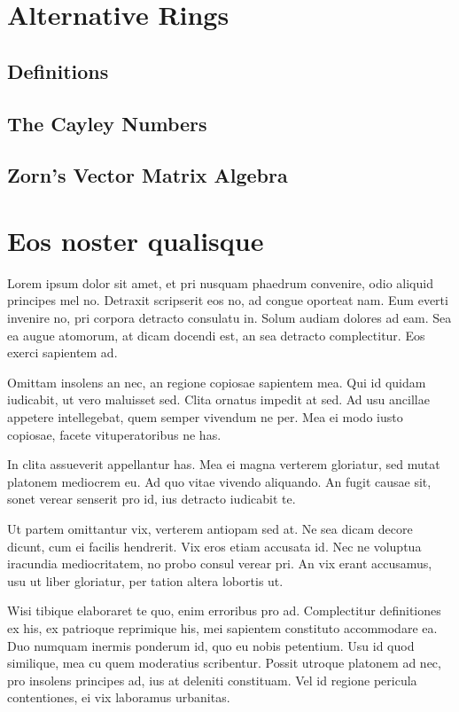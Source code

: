 \chapter{Alternative Rings} 
\label{altrings} %
\section{Definitions} 
\label{defs} 
 
\section{The Cayley Numbers} 
\label{cayley} 
 
\section{Zorn's Vector Matrix Algebra} 
\label{zorn} 

\chapter{Eos noster qualisque}
Lorem ipsum dolor sit amet, et pri nusquam phaedrum convenire, odio aliquid principes mel no. Detraxit scripserit eos no, ad congue oporteat nam. Eum everti invenire no, pri corpora detracto consulatu in. Solum audiam dolores ad eam. Sea ea augue atomorum, at dicam docendi est, an sea detracto complectitur. Eos exerci sapientem ad.

Omittam insolens an nec, an regione copiosae sapientem mea. Qui id quidam iudicabit, ut vero maluisset sed. Clita ornatus impedit at sed. Ad usu ancillae appetere intellegebat, quem semper vivendum ne per. Mea ei modo iusto copiosae, facete vituperatoribus ne has.

In clita assueverit appellantur has. Mea ei magna verterem gloriatur, sed mutat platonem mediocrem eu. Ad quo vitae vivendo aliquando. An fugit causae sit, sonet verear senserit pro id, ius detracto iudicabit te.

Ut partem omittantur vix, verterem antiopam sed at. Ne sea dicam decore dicunt, cum ei facilis hendrerit. Vix eros etiam accusata id. Nec ne voluptua iracundia mediocritatem, no probo consul verear pri. An vix erant accusamus, usu ut liber gloriatur, per tation altera lobortis ut.

Wisi tibique elaboraret te quo, enim erroribus pro ad. Complectitur definitiones ex his, ex patrioque reprimique his, mei sapientem constituto accommodare ea. Duo numquam inermis ponderum id, quo eu nobis petentium. Usu id quod similique, mea cu quem moderatius scribentur. Possit utroque platonem ad nec, pro insolens principes ad, ius at deleniti constituam. Vel id regione pericula contentiones, ei vix laboramus urbanitas.

